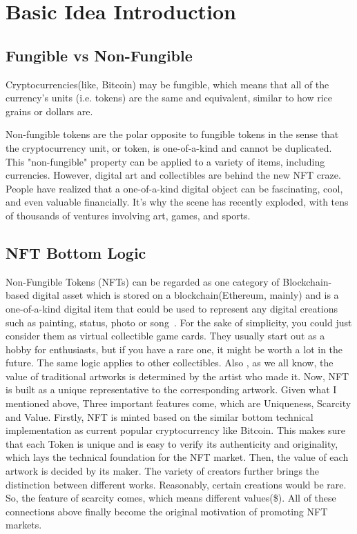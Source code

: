 \section{Basic Idea Introduction}

\subsection{Fungible vs Non-Fungible}
Cryptocurrencies(like, Bitcoin) may be fungible, which means that all of the currency's units (i.e. tokens) are the same and equivalent, similar to how rice grains or dollars are. 

Non-fungible tokens are the polar opposite to fungible tokens in the sense that  the cryptocurrency unit, or token, is one-of-a-kind and cannot be duplicated. This "non-fungible" property can be applied to a variety of items, including currencies. However, digital art and collectibles are behind the new NFT craze. People have realized that a one-of-a-kind digital object can be fascinating, cool, and even valuable financially. It's why the scene has recently exploded, with tens of thousands of ventures involving art, games, and sports.

\subsection{NFT Bottom Logic}
Non-Fungible Tokens (NFTs) can be regarded as one category of Blockchain-based digital asset which is stored on a blockchain(Ethereum, mainly) and is a one-of-a-kind digital item that could be used to represent any digital creations such as painting, status, photo or song~\cite{nadini2021mapping}. For the sake of simplicity, you could just consider them as virtual collectible game cards. They usually start out as a hobby for enthusiasts, but if you have a rare one, it might be worth a lot in the future. The same logic applies to other collectibles. Also , as we all know, the value of traditional artworks is determined by the artist who made it. Now, NFT is built as a unique representative to the corresponding artwork. Given what I mentioned above, Three important features come, which are Uniqueness, Scarcity and Value. Firstly, NFT is minted based on the similar bottom technical implementation as current popular cryptocurrency like Bitcoin. This makes sure that each Token is unique and is easy to verify its authenticity and originality, which lays the technical foundation for the NFT market. Then, the value of each artwork is decided by its maker. The variety of creators further brings the distinction between different works. Reasonably, certain creations would be rare. So, the feature of scarcity comes, which means different values(\$). All of these connections above finally become the original motivation of promoting NFT markets. 


